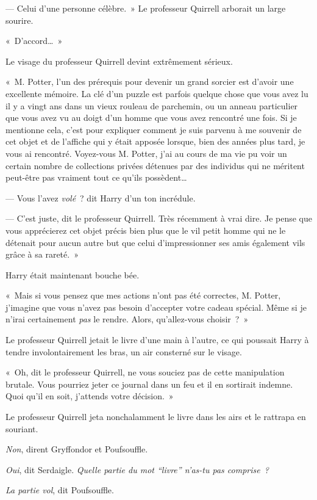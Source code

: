 --- Celui d'une personne célèbre.~» Le professeur Quirrell arborait un large sourire.

«~D'accord…~»

Le visage du professeur Quirrell devint extrêmement sérieux.

«~M. Potter, l'un des prérequis pour devenir un grand sorcier est d'avoir une excellente mémoire. La clé d'un puzzle est parfois quelque chose que vous avez lu il y a vingt ans dans un vieux rouleau de parchemin, ou un anneau particulier que vous avez vu au doigt d'un homme que vous avez rencontré une fois. Si je mentionne cela, c'est pour expliquer comment je suis parvenu à me souvenir de cet objet et de l'affiche qui y était apposée lorsque, bien des années plus tard, je vous ai rencontré. Voyez-vous M. Potter, j'ai au cours de ma vie pu voir un certain nombre de collections privées détenues par des individus qui ne méritent peut-être pas vraiment tout ce qu'ils possèdent…

--- Vous l'avez \emph{volé}~? dit Harry d'un ton incrédule.

--- C'est juste, dit le professeur Quirrell. Très récemment à vrai dire. Je pense que vous apprécierez cet objet précis bien plus que le vil petit homme qui ne le détenait pour aucun autre but que celui d'impressionner ses amis également vils grâce à sa rareté.~»

Harry était maintenant bouche bée.

«~Mais si vous pensez que mes actions n'ont pas été correctes, M. Potter, j'imagine que vous n'avez pas besoin d'accepter votre cadeau spécial. Même si je n'irai certainement \emph{pas} le rendre. Alors, qu'allez-vous choisir~?~»

Le professeur Quirrell jetait le livre d'une main à l'autre, ce qui poussait Harry à tendre involontairement les bras, un air consterné sur le visage.

«~Oh, dit le professeur Quirrell, ne vous souciez pas de cette manipulation brutale. Vous pourriez jeter ce journal dans un feu et il en sortirait indemne. Quoi qu'il en soit, j'attends votre décision.~»

Le professeur Quirrell jeta nonchalamment le livre dans les airs et le rattrapa en souriant.

\emph{Non}, dirent Gryffondor et Poufsouffle.

\emph{Oui}, dit Serdaigle. \emph{Quelle partie du mot “livre” n'as-tu pas comprise~?}

\emph{La partie vol}, dit Poufsouffle.

